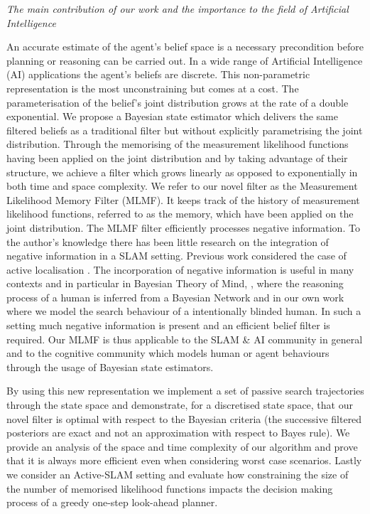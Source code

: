 \textit{The main contribution of our work and the importance to the field of Artificial Intelligence} 

An accurate estimate of the agent's belief space is a necessary precondition before planning or reasoning can be carried out.
In a wide range of Artificial Intelligence (AI) applications the agent's beliefs are discrete. This non-parametric representation
is the most unconstraining but comes at a cost. The parameterisation of the belief's joint distribution grows at the rate of a double exponential.
We propose a Bayesian state estimator which delivers the same filtered beliefs as a traditional filter but without explicitly parametrising the 
joint distribution. Through the memorising of the measurement likelihood functions having been applied on the joint distribution 
and by taking advantage of their structure, we achieve a filter which grows linearly as opposed to exponentially 
in both time and space complexity. We refer to our novel filter as the Measurement Likelihood Memory Filter (MLMF). 
It keeps track of the history of measurement likelihood functions, referred to as the memory, which 
have been applied on the joint distribution.
The MLMF filter efficiently processes negative information. To the author's knowledge there has been little
research on the integration of negative information in a SLAM setting. Previous work considered the case of active localisation \cite{NegInfoFurtherStudies}.
The incorporation of negative information is useful in many contexts and in particular in Bayesian Theory of Mind, \cite{Bake_Saxe_Tene_2011},
where the reasoning process of a human is inferred from a Bayesian Network and in our own work \cite{deChambrier2013} where we model the 
search behaviour of a intentionally blinded human. In such a setting much negative information is present and an efficient belief filter is required. 
Our MLMF is thus applicable to the SLAM \& AI community in general and to the cognitive community which models human or agent behaviours through 
the usage of Bayesian state estimators.

By using this new representation we implement a set of passive search trajectories through the state 
space and demonstrate, for a discretised state space, that our novel filter is optimal with respect to the Bayesian criteria (the successive
filtered posteriors are exact and not an approximation with respect to Bayes rule). We provide an analysis of the space and time complexity of 
our algorithm and prove that it is always more efficient even when considering worst case scenarios.
Lastly we consider an Active-SLAM setting and evaluate how constraining the size of the number of memorised likelihood 
functions impacts the decision making process of a greedy one-step look-ahead planner.

